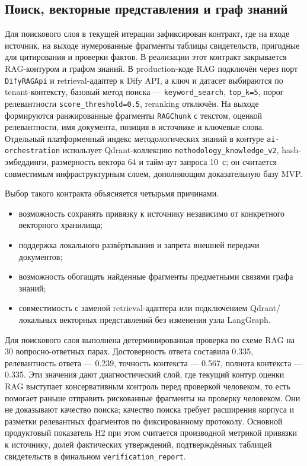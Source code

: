 \subsection{Поиск, векторные представления и граф знаний}

Для поискового слоя в текущей итерации зафиксирован контракт, где на входе
источник, на выходе нумерованные фрагменты таблицы свидетельств,
пригодные для цитирования и проверки фактов. В реализации этот контракт закрывается
RAG-контуром и графом знаний. В production-коде RAG подключён через
порт \texttt{DifyRAGApi} и retrieval-адаптер к Dify API, а ключ и датасет
выбираются по tenant-контексту, базовый метод поиска —
\texttt{keyword\_search}, \texttt{top\_k=5}, порог релевантности
\texttt{score\_threshold=0.5}, reranking отключён. На выходе формируются
ранжированные фрагменты \texttt{RAGChunk} с текстом, оценкой релевантности,
имя документа, позиция в источнике и ключевые слова.
Отдельный платформенный индекс методологических знаний в контуре
\texttt{ai-orchestration} использует Qdrant-коллекцию
\texttt{methodology\_knowledge\_v2}, hash-эмбеддинги, размерность
вектора 64 и тайм-аут запроса 10~с; он считается
совместимым инфраструктурным слоем, дополняющим доказательную базу MVP.

Выбор такого контракта объясняется четырьмя причинами.

\begin{itemize}
  \item возможность сохранять привязку к источнику независимо от конкретного
    векторного хранилища;
  \item поддержка локального развёртывания и запрета внешней передачи
    документов;
  \item возможность обогащать найденные фрагменты предметными связями
    графа знаний;
  \item совместимость с заменой retrieval-адаптера или подключением
    Qdrant/локальных векторных представлений без изменения узла LangGraph.
\end{itemize}

Для поискового слоя выполнена детерминированная проверка по схеме RAG
на 30 вопросно-ответных парах. Достоверность ответа составила 0.335,
релевантность ответа — 0.239, точность контекста — 0.567,
полнота контекста — 0.335. Эти значения дают
диагностический слой, где текущий контур оценки RAG выступает консервативным
контроль перед проверкой человеком, то есть помогает раньше
отправить рискованные фрагменты на проверку человеком. Они не доказывают
качество поиска; качество поиска требует расширения корпуса и
разметки релевантных фрагментов по фиксированному протоколу. Основной продуктовый
показатель H2 при этом считается производной метрикой привязки к источнику,
долей фактических утверждений, подтверждённых таблицей свидетельств в финальном
\texttt{verification\_report}.

